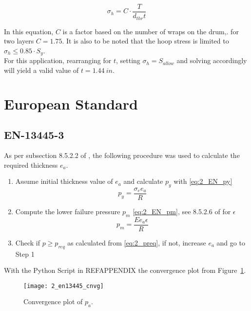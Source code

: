 \begin{equation}
	\label{eq:2_DNV_hoop}
	\sigma_h = C\cdot\frac{T}{d_{thr}t}
\end{equation}

In this equation, $C$ is a factor based on the number of wraps on the drum,. for two layers $C=1.75$. It is also to be noted that the hoop stress is limited to $\sigma_h \leq 0.85\cdot S_y$. \\

For this application, rearranging for $t$, setting $\sigma_h = S_{allow}$ and solving accordingly will yield a valid value of $t = 1.44 \ in$. 


\section{European Standard}
\subsection{EN-13445-3}
As per subsection 8.5.2.2 of \citep{EN134453}, the following procedure was used to calculate the required thickness $e_a$.

\begin{enumerate}
	\item Assume initial thickness value of $e_a$ and calculate $p_y$ with \ref{eq:2_EN_py}
		\begin{equation}
			\label{eq:2_EN_py}
			p_y = \frac{\sigma_e e_a}{R}
		\end{equation}
	\item Compute the lower failure pressure $p_m$ \ref{eq:2_EN_pm}, see 8.5.2.6 of \citep{EN134453} for $\epsilon$
		\begin{equation}
			\label{eq:2_EN_pm}
			p_m = \frac{E e_a  \epsilon}{R}
		\end{equation}
	\item Check if $p \geq p_{req}$ as calculated from \ref{eq:2_preq}, if not, increase $e_a$ and go to Step 1 \\
\end{enumerate}

	
With the Python Script in REFAPPENDIX the convergence plot from Figure~\ref{fig:2_en13445_cnvg}.
\begin{figure}[!htbp]
    \centering
    \texttt{[image: 2\_en13445\_cnvg]}
    \caption{Convergence plot of $p_a$.}
    \label{fig:2_en13445_cnvg}
\end{figure}


